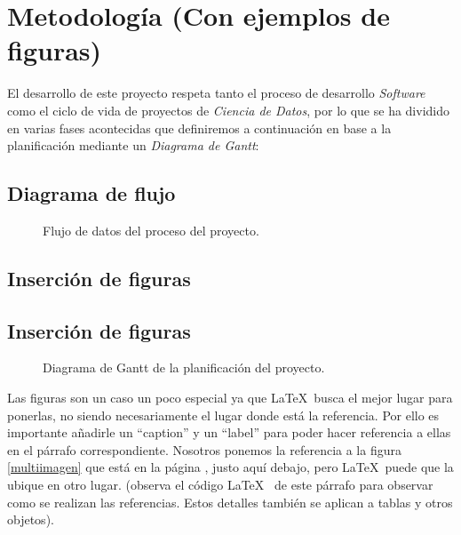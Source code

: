 
\chapter{Metodología (Con ejemplos de figuras)}
\label{metodologia}

El desarrollo de este proyecto respeta tanto el proceso de desarrollo \textit{Software} como el ciclo de vida de proyectos de \textit{Ciencia de Datos}, por lo que se ha dividido en varias fases acontecidas que definiremos a continuación en base a la planificación mediante un \textit{Diagrama de Gantt}:


\section{Diagrama de flujo}


    \begin{figure}[h]
        \centering
        
        \caption{Flujo de datos del proceso del proyecto.}
        \label{DataflowImage}
    \end{figure}
    \section{Inserción de figuras}

\section{Inserción de figuras}

    \begin{figure}[h]
        \centering
        
        \caption{Diagrama de Gantt de la planificación del proyecto.}
        \label{GranttImage}
    \end{figure}



Las figuras son un caso un poco especial ya que \LaTeX~busca el mejor lugar para ponerlas, no siendo necesariamente el lugar donde está la referencia. Por ello es importante añadirle un ``caption'' y un ``label'' para poder hacer referencia a ellas en el párrafo correspondiente. Nosotros ponemos la referencia a la figura \ref{multiimagen} que está en la página \pageref{multiimagen}, justo aquí debajo, pero \LaTeX ~puede que la ubique en otro lugar. (observa el código \LaTeX~ de este párrafo para observar como se realizan las referencias. Estos detalles también se aplican a tablas y otros objetos).

